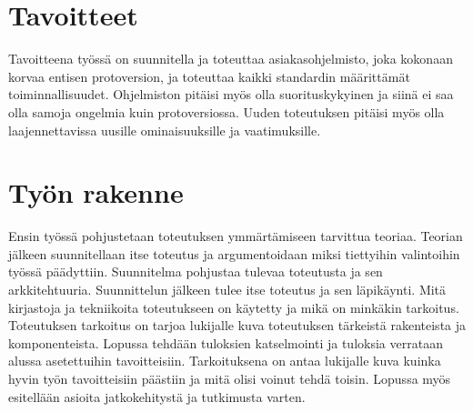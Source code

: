 \section{Tavoitteet}

Tavoitteena työssä on suunnitella ja toteuttaa asiakasohjelmisto, joka kokonaan korvaa entisen protoversion, ja toteuttaa kaikki standardin määrittämät toiminnallisuudet. Ohjelmiston pitäisi myös olla suorituskykyinen ja siinä ei saa olla samoja ongelmia kuin protoversiossa. Uuden toteutuksen pitäisi myös olla laajennettavissa uusille ominaisuuksille ja vaatimuksille.

\section{Työn rakenne}

Ensin työssä pohjustetaan toteutuksen ymmärtämiseen tarvittua teoriaa. Teorian jälkeen suunnitellaan itse toteutus ja argumentoidaan miksi tiettyihin valintoihin työssä päädyttiin. Suunnitelma pohjustaa tulevaa toteutusta ja sen arkkitehtuuria. Suunnittelun jälkeen tulee itse toteutus ja sen läpikäynti. Mitä kirjastoja ja tekniikoita toteutukseen on käytetty ja mikä on minkäkin tarkoitus. Toteutuksen tarkoitus on tarjoa lukijalle kuva toteutuksen tärkeistä rakenteista ja komponenteista. Lopussa tehdään tuloksien katselmointi ja tuloksia verrataan alussa asetettuihin tavoitteisiin. Tarkoituksena on antaa lukijalle kuva kuinka hyvin työn tavoitteisiin päästiin ja mitä olisi voinut tehdä toisin. Lopussa myös esitellään asioita jatkokehitystä ja tutkimusta varten.